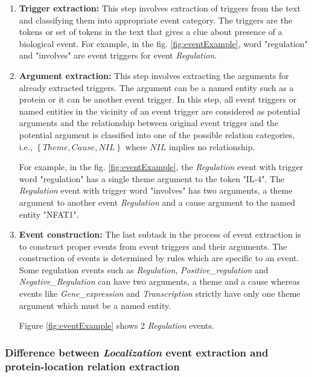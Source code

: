\begin{enumerate}

\item \textbf{Trigger extraction:} This step involves extraction of triggers from the text and classifying them into appropriate event category. The triggers  are the tokens or set of tokens in the text that gives a clue about presence of a biological event. For example, in the fig. \ref{fig:eventExample}, word "regulation" and "involves" are event triggers for event \textit{Regulation}.

\item \textbf{Argument extraction: } This step involves extracting the arguments for already extracted triggers. The argument can be a named entity such as a protein or it can be another event trigger. In this step, all event triggers or named entities in the vicinity of an event trigger are considered as potential arguments and the relationship between original event trigger and the potential argument is classified into one of the possible relation categories, i.e., $\left\lbrace Theme, Cause, NIL \right\rbrace$ where $NIL$ implies no relationship.

For example, in the fig. \ref{fig:eventExample}, the \textit{Regulation} event with trigger word "regulation" has a single theme argument to the token "IL-4". The \textit{Regulation} event with trigger word "involves" has two arguments, a theme argument to another event \textit{Regulation} and a cause argument to the named entity "NFAT1".

\item \textbf{Event construction: }  The last subtask in the process of event extraction is to construct proper events from event triggers and their arguments. The construction of events is determined by rules which are specific to an event. Some regulation events such as \textit{Regulation}, \textit{Positive\_regulation} and \textit{Negative\_Regulation} can have two arguments, a theme and a cause whereas events like \textit{Gene\_expression} and \textit{Transcription} strictly have only one theme argument which must be a named entity.

Figure \ref{fig:eventExample} shows 2 \textit{Regulation} events.

\end{enumerate}

\subsubsection{Difference between \textit{Localization} event extraction and protein-location relation extraction}

